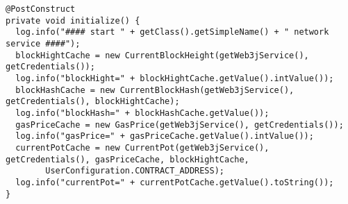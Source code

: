\begin{lstlisting}[basicstyle=\small]
@PostConstruct
private void initialize() {
  log.info("#### start " + getClass().getSimpleName() + " network service ####");
  blockHightCache = new CurrentBlockHeight(getWeb3jService(), getCredentials());
  log.info("blockHight=" + blockHightCache.getValue().intValue());
  blockHashCache = new CurrentBlockHash(getWeb3jService(), getCredentials(), blockHightCache);
  log.info("blockHash=" + blockHashCache.getValue());
  gasPriceCache = new GasPrice(getWeb3jService(), getCredentials());
  log.info("gasPrice=" + gasPriceCache.getValue().intValue());
  currentPotCache = new CurrentPot(getWeb3jService(), getCredentials(), gasPriceCache, blockHightCache,
  		UserConfiguration.CONTRACT_ADDRESS);
  log.info("currentPot=" + currentPotCache.getValue().toString());
}
\end{lstlisting}

